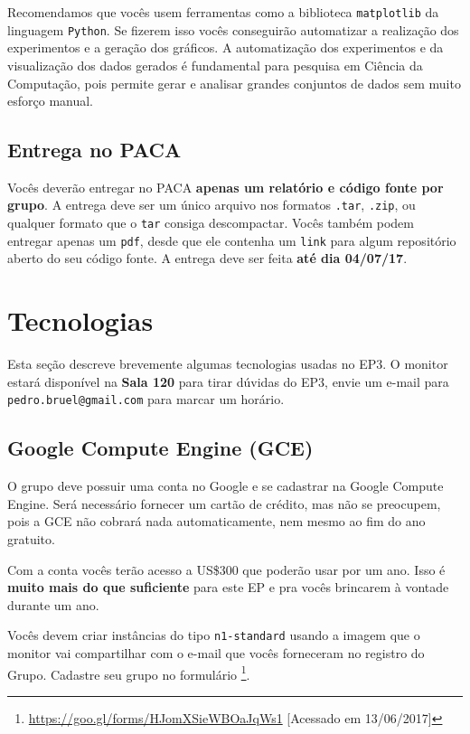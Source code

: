\documentclass[final,12pt,a4paper]{elsarticle}
\begin{document}
Recomendamos que vocês usem ferramentas como a biblioteca \texttt{matplotlib}
da linguagem \texttt{Python}. Se fizerem isso vocês conseguirão automatizar a
realização dos experimentos e a geração dos gráficos. A automatização dos
experimentos e da visualização dos dados gerados é fundamental para pesquisa em
Ciência da Computação, pois permite gerar e analisar grandes conjuntos de dados
sem muito esforço manual.

\subsection{Entrega no PACA}

Vocês deverão entregar no PACA \textbf{apenas um relatório e código fonte por
grupo}. A entrega deve ser um único arquivo nos formatos \texttt{.tar},
\texttt{.zip}, ou qualquer formato que o \texttt{tar} consiga descompactar.
Vocês também podem entregar apenas um \texttt{pdf}, desde que ele contenha
um \texttt{link} para algum repositório aberto do seu código fonte.
A entrega deve ser feita \textbf{até dia 04/07/17}.

\section{Tecnologias}

Esta seção descreve brevemente algumas tecnologias usadas no EP3.  O monitor
estará disponível na \textbf{Sala 120} para tirar dúvidas do EP3,
envie um e-mail para \texttt{pedro.bruel@gmail.com} para
marcar um horário.

\subsection{Google Compute Engine (GCE)}

O grupo deve possuir uma conta no Google e se cadastrar na Google Compute
Engine. Será necessário fornecer um cartão de crédito, mas não se preocupem,
pois a GCE não cobrará nada automaticamente, nem mesmo ao fim do ano gratuito.

Com a conta vocês terão acesso a US\$300 que poderão usar por um ano. Isso é
\textbf{muito mais do que suficiente} para este EP e pra vocês brincarem à
vontade durante um ano.

Vocês devem criar instâncias do tipo \texttt{n1-standard} usando a imagem que o
monitor vai compartilhar com o e-mail que vocês forneceram no registro do
Grupo. Cadastre seu grupo no formulário
\footnote{\url{https://goo.gl/forms/HJomXSieWBOaJqWs1} [Acessado em
13/06/2017]}.
\end{document}
